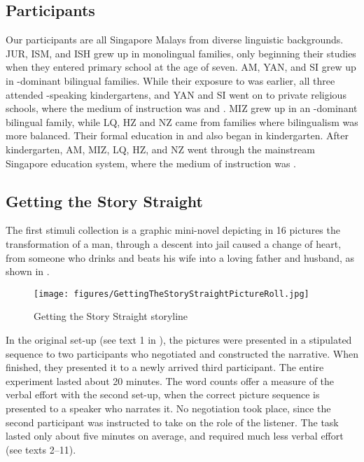 \documentclass[output=paper
,modfonts
,nonflat]{langsci/langscibook}
\begin{document}
\subsection{Participants}\label{Methodology:Participants}

Our participants are all Singapore Malays from diverse linguistic backgrounds. JUR, ISM, and ISH grew up in monolingual  families, only beginning their  studies when they entered primary school at the age of seven. AM, YAN, and SI grew up in  -dominant bilingual families. While their exposure to  was earlier, all three attended -speaking kindergartens, and YAN and SI went on to private religious schools, where the medium of instruction was  and . MIZ grew up in an -dominant bilingual family, while LQ, HZ and NZ came from families where bilingualism was more balanced. Their formal education in  and  also began in kindergarten. After kindergarten, AM, MIZ, LQ, HZ, and NZ went through the mainstream Singapore education system, where the medium of instruction was .

\subsection{Getting the Story Straight \citep{SanRoqueEtAl2012}}\label{Methodology:GTSS}
The first stimuli collection is a graphic mini-novel depicting in 16 pictures the transformation of a man, through a descent into jail caused a change of heart, from someone who drinks and beats his wife into a loving father and husband, as shown in . 

\begin{figure}
\texttt{[image: figures/GettingTheStoryStraightPictureRoll.jpg]}
\caption{Getting the Story Straight storyline \citep{SanRoqueEtAl2012}\label{fig:StraightStory}}
\end{figure}

\noindent
In the original set-up (see text 1 in ), the pictures were presented in a stipulated sequence to two participants who negotiated and constructed the narrative. When finished, they presented it to a newly arrived third participant. The entire experiment lasted about 20 minutes. The word counts offer a measure of the verbal effort with the second set-up, when the correct picture sequence is presented to a speaker who narrates it. No negotiation took place, since the second participant was instructed to take on the role of the listener. The task lasted only about five minutes on average, and required much less verbal effort (see texts 2--11).
\end{document}

